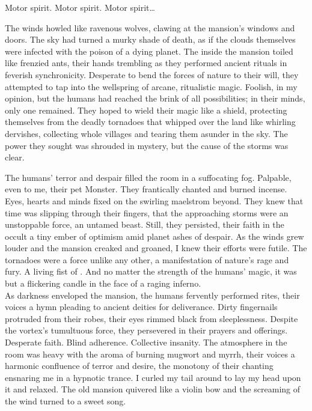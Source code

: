 Motor spirit. Motor spirit. Motor spirit… \\



The winds howled like ravenous wolves, clawing at the mansion's windows and doors. The sky had turned a murky shade of death, as if the clouds themselves were infected with the poison of a dying planet. The  inside the mansion toiled like frenzied ants, their hands trembling as they performed ancient rituals in feverish synchronicity. Desperate to bend the forces of nature to their will, they attempted to tap into the wellspring of arcane, ritualistic magic. Foolish, in my opinion, but the humans had reached the brink of all possibilities; in their minds, only one remained. They hoped to wield their magic like a shield, protecting themselves from the deadly tornadoes that whipped over the land like whirling dervishes, collecting whole villages and tearing them asunder in the sky. The power they sought was shrouded in mystery, but the cause of the storms was clear. \\


The humans' terror and despair filled the room in a suffocating fog. Palpable, even to me, their pet  Monster. They frantically chanted and burned incense. Eyes, hearts and minds fixed on the swirling maelstrom beyond. They knew that time was slipping through their fingers, that the approaching storms were an unstoppable force, an untamed beast. Still, they persisted, their faith in the occult a tiny ember of optimism amid planet  ashes of despair. As the winds grew louder and the mansion creaked and groaned, I knew their efforts were futile. The tornadoes were a force unlike any other, a manifestation of nature's rage and fury. A living fist of . And no matter the strength of the humans' magic, it was but a flickering candle in the face of a raging inferno. \\

As darkness enveloped the mansion, the humans fervently performed rites, their voices a hymn pleading to ancient deities for deliverance. Dirty fingernails protruded from their robes, their eyes rimmed black from sleeplessness. Despite the vortex's tumultuous force, they persevered in their prayers and offerings. Desperate faith. Blind adherence. Collective insanity. The atmosphere in the room was heavy with the aroma of burning mugwort and myrrh, their voices a harmonic confluence of terror and desire, the monotony of their chanting ensnaring me in a hypnotic trance. I curled my tail around to lay my head upon it and relaxed. The old mansion quivered like a violin bow and the screaming of the wind turned to a sweet song. \\

